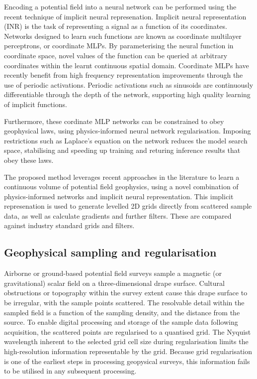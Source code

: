 \documentclass[manuscript.tex]{subfiles}
\begin{document}
Encoding a potential field into a neural network can be performed using the recent technique of implicit neural represenation.
Implicit neural representation (INR) is the task of representing a signal as a function of its coordinates.
Networks designed to learn such functions are known as coordinate multilayer perceptrons, or coordinate MLPs.
By parameterising the neural function in coordinate space, novel values of the function can be queried at arbitrary coordinates within the learnt continuous spatial domain.
Coordinate MLPs have recently benefit from high frequency representation improvements through the use of periodic activations.
Periodic activations such as sinusoids are continuously differentiable through the depth of the network, supporting high quality learning of implicit functions.

Furthermore, these cordinate MLP networks can be constrained to obey geophysical laws, using physics-informed neural network regularisation.
Imposing restrictions such as Laplace's equation on the network reduces the model search space, stabilising and speeding up training and returing inference results that obey these laws.

The proposed method leverages recent approaches in the literature to learn a continuous volume of potential field geophysics, using a novel combination of physics-informed networks and implicit neural representation.
This implicit represenation is used to generate levelled 2D grids directly from scattered sample data, as well as calculate gradients and further filters.
These are compared against industry standard grids and filters.

\subsection{Geophysical sampling and regularisation}
\label{sec:geo_airborne}
Airborne or ground-based potential field surveys sample a magnetic (or gravitational) scalar field on a three-dimensional drape surface.
Cultural obstructions or topography within the survey extent cause this drape surface to be irregular, with the sample points scattered.
The resolvable detail within the sampled field is a function of the sampling density, and the distance from the source.
To enable digital processing and storage of the sample data following acquisition, the scattered points are regularised to a quantised grid.
The Nyquist wavelength inherent to the selected grid cell size during regularisation limits the high-resolution information representable by the grid.
Because grid regularisation is one of the earliest steps in processing geopysical surveys, this information fails to be utilised in any subsequent processing.
\end{document}
